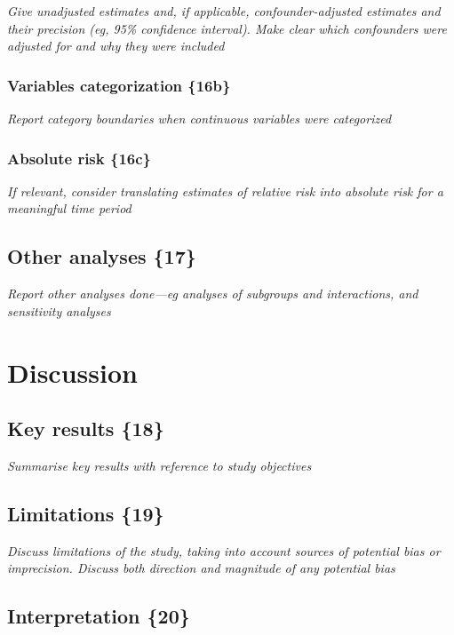 {\em Give unadjusted estimates and, if applicable, confounder-adjusted
estimates and their precision (eg, 95\% confidence interval). Make
clear which confounders were adjusted for and why they were included}

\subsubsection{Variables categorization \{16b\}}

{\em Report category boundaries when continuous variables were categorized}

\subsubsection{Absolute risk \{16c\}}

{\em If relevant, consider translating estimates of relative risk into
absolute risk for a meaningful time period}

\subsection{Other analyses \{17\}}

{\em Report other analyses done—eg analyses of subgroups and interactions,
and sensitivity analyses}

\section{Discussion}

\subsection{Key results \{18\}}

{\em Summarise key results with reference to study objectives}

\subsection{Limitations \{19\}}

{\em Discuss limitations of the study, taking into account sources of
potential bias or imprecision. Discuss both direction and magnitude of
any potential bias}

\subsection{Interpretation \{20\}}

